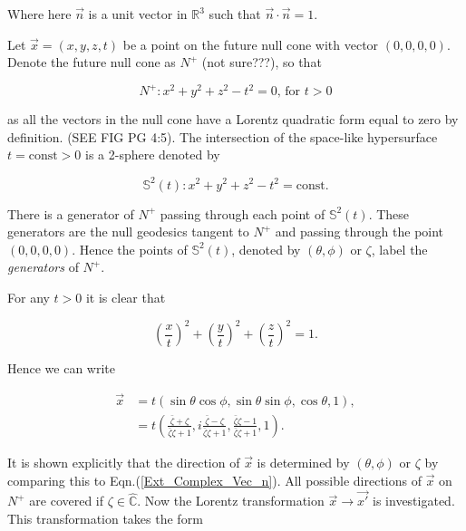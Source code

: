 \noindent Where here $\vec{n}$ is a unit vector in $\mathbb{R}^3$ such that $\vec{n} \cdot \vec{n} = 1$.

Let $\vec{x} = (x,y,z,t)$ be a point on the future null cone with vector $(0,0,0,0)$. Denote the future null cone as $N^{+}$ (not sure???), so that 

\begin{equation*}
N^+ : x^2 + y^2 + z^2 - t^2 = 0 \text{,  for  } t>0
\end{equation*}

as all the vectors in the null cone have a Lorentz quadratic form equal to zero by definition. (SEE FIG PG 4:5). The intersection of the space-like hypersurface $t = \text{const}>0$ is a 2-sphere denoted by 

\begin{equation*}
\mathbb{S}^2 (t) : x^2 + y^2 + z^2 - t^2 = \text{const}.
\end{equation*}

\noindent There is a generator of $N^+$ passing through each point of $\mathbb{S}^2 (t)$. These generators are the null geodesics tangent to $N^+$ and passing through the point $(0,0,0,0)$. Hence the points of $\mathbb{S}^2 (t)$, denoted by $(\theta,\phi)$ or $\zeta$, label the \textit{generators} of $N^{+}$.

For any $t>0$ it is clear that

\begin{equation*}
\left(\frac{x}{t}\right)^2 +\left(\frac{y}{t}\right)^2 +\left(\frac{z}{t}\right)^2 = 1.
\end{equation*}

\noindent Hence we can write

\begin{eqnarray}\nonumber
\vec{x} & = t(\sin{\theta}\cos{\phi}, \sin{\theta}\sin{\phi}, \cos{\theta}, 1), \\\label{Ext_Complex_vec_x_relations}
        & = t\left( \frac{\bar{\zeta} + \zeta}{\bar{\zeta}\zeta + 1}  ,i\frac{\bar{\zeta} - \zeta}{\bar{\zeta}\zeta + 1}, \frac{\bar{\zeta}\zeta - 1}{\bar{\zeta}\zeta + 1},1  \right).
\end{eqnarray}

\noindent It is shown explicitly that the direction of $\vec{x}$ is determined by $(\theta,\phi)$ or $\zeta$ by comparing this to Eqn.(\ref{Ext_Complex_Vec_n}). All possible directions of $\vec{x}$ on $N^{+}$ are covered if $\zeta \in \hat{\mathbb{C}}$. Now the Lorentz transformation $\vec{x} \rightarrow \vec{x'}$ is investigated. This transformation takes the form  


